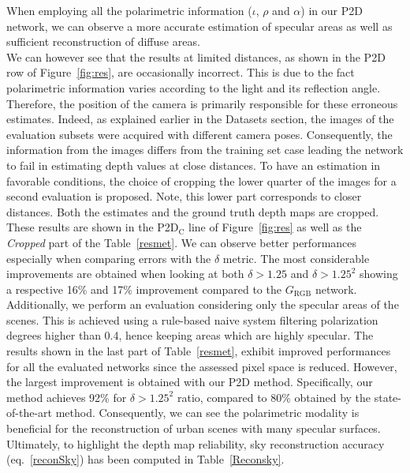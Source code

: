 When employing all the polarimetric information ($\iota$, $\rho$ and $\alpha$) in our P2D network, we can observe a more accurate estimation of specular areas as well as sufficient reconstruction of diffuse areas.\\
We can however see that the results at limited distances, as shown in the P2D row of Figure~\ref{fig:res}, are occasionally incorrect.
This is due to the fact polarimetric information varies according to the light and its reflection angle. Therefore, the position of the camera is primarily responsible for these erroneous estimates.
Indeed, as explained earlier in the Datasets section, the images of the evaluation subsets were acquired with different camera poses. Consequently, the information from the images differs from the training set case leading the network to fail in estimating depth values at close distances. 
To have an estimation in favorable conditions, the choice of cropping the lower quarter of the images for a second evaluation is proposed. Note, this lower part corresponds to closer distances. Both the estimates and the ground truth depth maps are cropped. 
These results are shown in the P2D$_\textrm{C}$ line of Figure~\ref{fig:res} as well as the \textit{Cropped} part of the Table~\ref{resmet}. We can observe better performances especially when comparing errors with the $\delta$ metric. The most considerable improvements are obtained when looking at both $\delta > 1.25$ and $\delta > 1.25^2$ showing a respective 16\% and 17\% improvement compared to the $G_{\textrm{RGB}}$ network.\\

Additionally, we perform an evaluation considering only the specular areas of the scenes. This is achieved using a rule-based naive system filtering polarization degrees higher than 0.4, hence keeping areas which are highly specular. 
The results shown in the last part of Table~\ref{resmet}, exhibit improved performances for all the evaluated networks since the assessed pixel space is reduced. However, the largest improvement is obtained with our P2D method. Specifically, our method achieves 92\% for $\delta > 1.25^2$ ratio, compared to 80\% obtained by the state-of-the-art method.
Consequently, we can see the polarimetric modality is beneficial for the reconstruction of urban scenes with many specular surfaces. 
Ultimately, to highlight the depth map reliability, sky reconstruction accuracy (eq.~\ref{reconSky}) has been computed in Table~\ref{Reconsky}.\\

